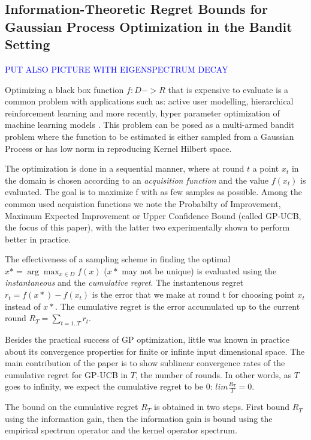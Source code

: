 \documentclass[10pt,journal,a4paper]{IEEEtran}
\begin{document}
\subsection{Information-Theoretic Regret Bounds for Gaussian Process Optimization in the Bandit Setting}
\textcolor{blue}{ PUT ALSO PICTURE WITH EIGENSPECTRUM DECAY
}

Optimizing a black box function $f: D->R$ that is expensive to evaluate is a common problem with applications such as: active user modelling, hierarchical reinforcement learning\cite{BPtutorial} and more recently, hyper parameter optimization of machine learning models \cite{hyperparameter}. This problem can be posed as a multi-armed bandit problem where the function to be estimated is either sampled from a Gaussian Process or has low norm in reproducing Kernel Hilbert space.

The optimization is done in a sequential manner, where at round $t$ a point $x_t$ in the domain is chosen according to an \textit{acquisition function} and the value $f(x_t)$ is evaluated. The goal is to maximize f with as few samples as possible. Among the common used acquistion functions we note the Probabilty of Improvement, Maximum Expected Improvement or Upper Confidence Bound (called GP-UCB, the focus of this paper), with the latter two experimentally shown to perform better in practice. 

The effectiveness of a sampling scheme in finding the optimal $x* = \arg\max_{x\in D}f(x)$ ($x*$  may not be unique) is evaluated using the \textit{instantaneous} and the 
\textit{cumulative regret}.  The instantenous regret $r_t = f(x*) - f(x_t)$ is the error that we make at round t for choosing point $x_t$ instead of $x*$. The cumulative regret is the error accumulated up to the current round $R_T = \sum_{t=1..T} r_t$.

Besides the practical success of GP optimization, little was known in practice about its convergence properties for finite or infinte input dimensional space. The main contribution of the paper is to show sublinear convergence rates of the cumulative regret for GP-UCB in $T$, the number of rounds. In other words, as $T$ goes to infinity, we expect the cumulative regret to be 0: $lim \frac{R_T}{T} = 0$.

The bound on the cumulative regret $R_T$ is obtained in two steps. First bound $R_T$ using the information gain, then the information gain is bound using the empirical spectrum operator and the kernel operator spectrum.
\end{document}
